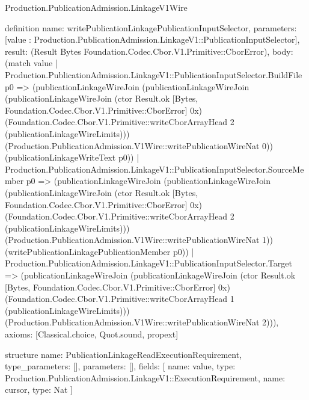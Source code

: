 \begin{lexlean}{Production.PublicationAdmission.LinkageV1Wire}
\begin{semanticmodule}
definition{
  name: writePublicationLinkagePublicationInputSelector,
  parameters: [value : Production.PublicationAdmission.LinkageV1::PublicationInputSelector],
  result: (Result Bytes Foundation.Codec.Cbor.V1.Primitive::CborError),
  body: (match value
    | Production.PublicationAdmission.LinkageV1::PublicationInputSelector.BuildFile p0 => (publicationLinkageWireJoin (publicationLinkageWireJoin (publicationLinkageWireJoin (ctor Result.ok [Bytes, Foundation.Codec.Cbor.V1.Primitive::CborError] 0x) (Foundation.Codec.Cbor.V1.Primitive::writeCborArrayHead 2 (publicationLinkageWireLimits))) (Production.PublicationAdmission.V1Wire::writePublicationWireNat 0)) (publicationLinkageWriteText p0))
    | Production.PublicationAdmission.LinkageV1::PublicationInputSelector.SourceMember p0 => (publicationLinkageWireJoin (publicationLinkageWireJoin (publicationLinkageWireJoin (ctor Result.ok [Bytes, Foundation.Codec.Cbor.V1.Primitive::CborError] 0x) (Foundation.Codec.Cbor.V1.Primitive::writeCborArrayHead 2 (publicationLinkageWireLimits))) (Production.PublicationAdmission.V1Wire::writePublicationWireNat 1)) (writePublicationLinkagePublicationMember p0))
    | Production.PublicationAdmission.LinkageV1::PublicationInputSelector.Target => (publicationLinkageWireJoin (publicationLinkageWireJoin (ctor Result.ok [Bytes, Foundation.Codec.Cbor.V1.Primitive::CborError] 0x) (Foundation.Codec.Cbor.V1.Primitive::writeCborArrayHead 1 (publicationLinkageWireLimits))) (Production.PublicationAdmission.V1Wire::writePublicationWireNat 2))),
  axioms: [Classical.choice, Quot.sound, propext]
}

structure{
  name: PublicationLinkageReadExecutionRequirement,
  type_parameters: [],
  parameters: [],
  fields: [
    {name: value, type: Production.PublicationAdmission.LinkageV1::ExecutionRequirement},
    {name: cursor, type: Nat}
  ]
}


\end{semanticmodule}
\end{lexlean}
